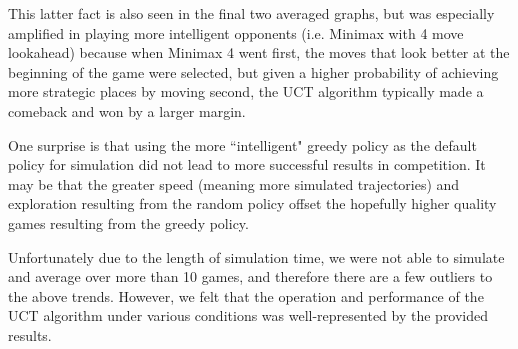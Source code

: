 \documentclass[12pt,letterpaper]{article}
\begin{document}
This latter fact is also seen in the final two averaged graphs, but was especially amplified in playing more intelligent opponents (i.e. Minimax with 4 move lookahead) because when Minimax 4 went first, the moves that look better at the beginning of the game were selected, but given a higher probability of achieving more strategic places by moving second, the UCT algorithm typically made a comeback and won by a larger margin.

One surprise is that using the more ``intelligent" greedy policy as the default policy for simulation did not lead to more successful results in competition. It may be that the greater speed (meaning more simulated trajectories) and exploration resulting from the random policy offset the hopefully higher quality games resulting from the greedy policy.

Unfortunately due to the length of simulation time, we were not able to simulate and average over more than 10 games, and therefore there are a few outliers to the above trends.  However, we felt that the operation and performance of the UCT algorithm under various conditions was well-represented by the provided results.
\end{document}
